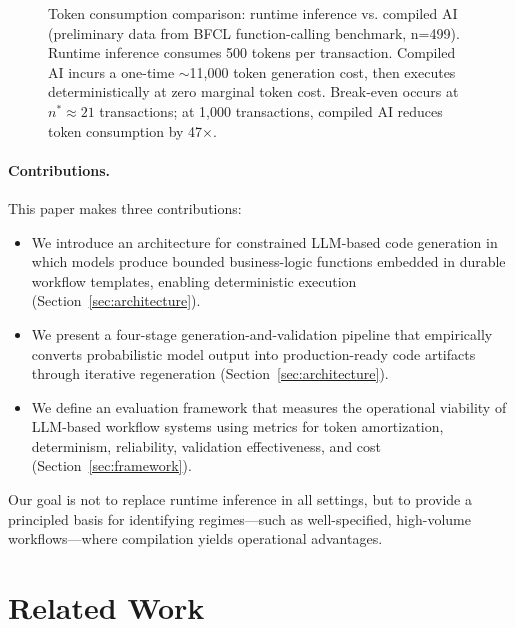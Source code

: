 \documentclass[11pt]{article}
\begin{document}
\begin{figure}[ht]
\begin{tikzpicture}[scale=0.9]
\end{tikzpicture}
\caption{Token consumption comparison: runtime inference vs. compiled AI (preliminary data from BFCL function-calling benchmark, n=499). Runtime inference consumes 500 tokens per transaction. Compiled AI incurs a one-time $\sim$11,000 token generation cost, then executes deterministically at zero marginal token cost. Break-even occurs at $n^*\approx21$ transactions; at 1,000 transactions, compiled AI reduces token consumption by 47$\times$.}
\label{fig:economics}
\end{figure}

\paragraph{Contributions.}
This paper makes three contributions:
\begin{itemize}
    \item We introduce an architecture for constrained LLM-based code generation in which models produce bounded business-logic functions embedded in durable workflow templates, enabling deterministic execution (Section~\ref{sec:architecture}).
    \item We present a four-stage generation-and-validation pipeline that empirically converts probabilistic model output into production-ready code artifacts through iterative regeneration (Section~\ref{sec:architecture}).
    \item We define an evaluation framework that measures the operational viability of LLM-based workflow systems using metrics for token amortization, determinism, reliability, validation effectiveness, and cost (Section~\ref{sec:framework}).
\end{itemize}

Our goal is not to replace runtime inference in all settings, but to provide a principled basis for identifying regimes---such as well-specified, high-volume workflows---where compilation yields operational advantages.

\section{Related Work}
\label{sec:related-work}
\end{document}
